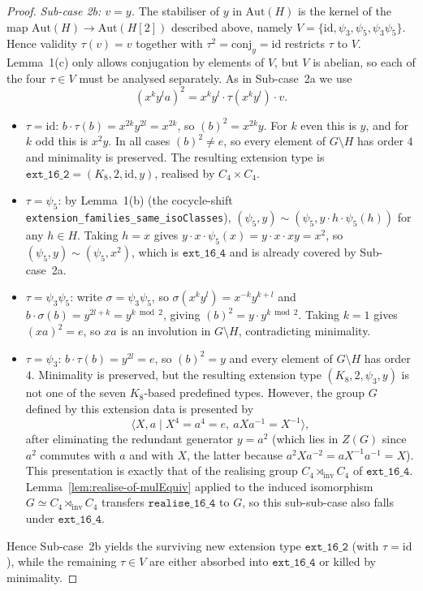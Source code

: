 \begin{proof}
  \smallskip
  \noindent
  \emph{Sub-case 2b: $v = y$.} The stabiliser of $y$ in $\mathrm{Aut}(H)$ is
  the kernel of the map $\mathrm{Aut}(H) \to \mathrm{Aut}(H[2])$ described
  above, namely $V = \{\mathrm{id}, \psi_3, \psi_5, \psi_3 \psi_5\}$. Hence
  validity $\tau(v) = v$ together with $\tau^2 = \mathrm{conj}_y = \mathrm{id}$
  restricts $\tau$ to $V$. Lemma~1(c) only allows conjugation by elements of
  $V$, but $V$ is abelian, so each of the four $\tau \in V$ must be analysed
  separately. As in Sub-case~2a we use
  \[
    (x^k y^l a)^2 = x^k y^l \cdot \tau(x^k y^l) \cdot v.
  \]
  \begin{itemize}
    \item $\tau = \mathrm{id}$: $b \cdot \tau(b) = x^{2k} y^{2l} = x^{2k}$, so
    $(b)^2 = x^{2k} y$. For $k$ even this is $y$, and for $k$ odd this is
    $x^2 y$. In all cases $(b)^2 \neq e$, so every element of $G \setminus H$
    has order $4$ and minimality is preserved. The resulting extension type
    is $\mathtt{ext\_16\_2} = (K_8, 2, \mathrm{id}, y)$, realised by $C_4
    \times C_4$.
    \item $\tau = \psi_5$: by Lemma~1(b) (the cocycle-shift
    \texttt{extension\_families\_same\_isoClasses}), $(\psi_5, y) \sim (\psi_5,
    y \cdot h \cdot \psi_5(h))$ for any $h \in H$. Taking $h = x$ gives
    $y \cdot x \cdot \psi_5(x) = y \cdot x \cdot xy = x^2$, so $(\psi_5, y) \sim
    (\psi_5, x^2)$, which is $\mathtt{ext\_16\_4}$ and is already covered by
    Sub-case~2a.
    \item $\tau = \psi_3 \psi_5$: write $\sigma = \psi_3 \psi_5$, so
    $\sigma(x^k y^l) = x^{-k} y^{k + l}$ and $b \cdot \sigma(b) = y^{2l + k} =
    y^{k \bmod 2}$, giving $(b)^2 = y \cdot y^{k \bmod 2}$. Taking $k = 1$
    gives $(x a)^2 = e$, so $x a$ is an involution in $G \setminus H$,
    contradicting minimality.
    \item $\tau = \psi_3$: $b \cdot \tau(b) = y^{2l} = e$, so $(b)^2 = y$ and
    every element of $G \setminus H$ has order $4$. Minimality is preserved,
    but the resulting extension type $(K_8, 2, \psi_3, y)$ is not one of the
    seven $K_8$-based predefined types. However, the group $G$ defined by this
    extension data is presented by
    \[
      \langle X, a \mid X^4 = a^4 = e,\ a X a^{-1} = X^{-1} \rangle,
    \]
    after eliminating the redundant generator $y = a^2$ (which lies in
    $Z(G)$ since $a^2$ commutes with $a$ and with $X$, the latter because
    $a^2 X a^{-2} = a X^{-1} a^{-1} = X$). This presentation is exactly
    that of the realising group $C_4 \rtimes_{\mathrm{inv}} C_4$ of
    $\mathtt{ext\_16\_4}$. Lemma~\ref{lem:realise-of-mulEquiv} applied to the
    induced isomorphism $G \simeq C_4 \rtimes_{\mathrm{inv}} C_4$ transfers
    $\mathtt{realise\_16\_4}$ to $G$, so this sub-sub-case also falls under
    $\mathtt{ext\_16\_4}$.
  \end{itemize}
  Hence Sub-case~2b yields the surviving new extension type
  $\mathtt{ext\_16\_2}$ (with $\tau = \mathrm{id}$), while the remaining
  $\tau \in V$ are either absorbed into $\mathtt{ext\_16\_4}$ or killed by
  minimality.


\end{proof}
